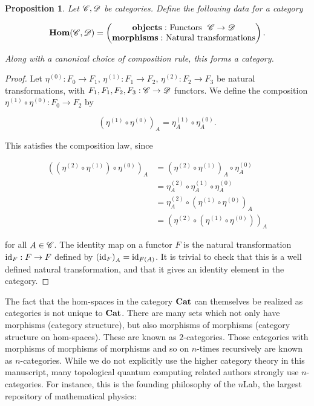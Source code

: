 \documentclass{article}
\newtheorem{proposition}{Proposition}[section]
\theoremstyle{definition}
\numberwithin{figure}{section}
\begin{document}
\begin{proposition} Let $\mathscr{C},\mathscr{D}$ be categories. Define the following data for a category


$$\bold{Hom}(\mathscr{C},\mathscr{D})=
\begin{pmatrix}
\bold{objects:}\text{ Functors }\,\,\mathscr{C}\to \mathscr{D}\\
\bold{morphisms:}\text{ Natural transformations}
\end{pmatrix}.$$

Along with a canonical choice of composition rule, this forms a category.
\end{proposition}
\begin{proof} Let $\eta^{(0)}: F_0\to F_1$, $\eta^{(1)}:F_1\to F_2$, $\eta^{(2)}: F_2\to F_3$ be natural transformations, with $F_1,F_1,F_2,F_3:\mathscr{C}\to \mathscr{D}$ functors. We define the composition $\eta^{(1)}\circ \eta^{(0)}:F_0\to F_2$ by

$$\left(\eta^{(1)}\circ \eta^{(0)}\right)_A=\eta^{(1)}_A\circ \eta^{(0)}_A.$$

This satisfies the composition law, since

\begin{align*}
\left(\left(\eta^{(2)}\circ \eta^{(1)}\right)\circ \eta^{(0)}\right)_A&=\left(\eta^{(2)}\circ \eta^{(1)}\right)_A\circ \eta^{(0)}_A\\
&=\eta^{(2)}_A\circ \eta^{(1)}_A\circ \eta^{(0)}_A\\
&=\eta^{(2)}_A\circ \left(\eta^{(1)}\circ \eta^{(0)}\right)_A\\
&=\left(\eta^{(2)}\circ \left(\eta^{(1)}\circ \eta^{(0)}\right)\right)_A
\end{align*}

for all $A\in \mathscr{C}$. The identity map on a functor $F$ is the natural transformation $\mathrm{id}_{F}:F\to F$ defined by $\left(\mathrm{id}_F\right)_A=\mathrm{id}_{F(A)}$. It is trivial to check that this is a well defined natural transformation, and that it gives an identity element in the category.
\end{proof}

The fact that the hom-spaces in the category $\bold{Cat}$ can themselves be realized as categories is not unique to $\bold{Cat}$. There are many sets which not only have morphisms (category structure), but also morphisms of morphisms (category structure on hom-spaces). These are known as $2$-categories. Those categories with morphisms of morphisms of morphisms and so on $n$-times recursively are known as $n$-categories. While we do not explicitly use the higher category theory in this manuscript, many topological quantum computing related authors strongly use $n$-categories. For instance, this is the founding philosophy of the $n$Lab, the largest repository of mathematical physics:
\end{document}
